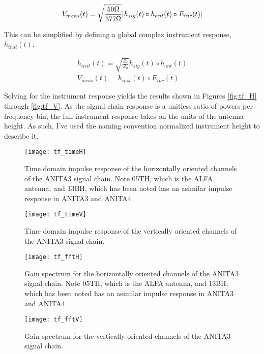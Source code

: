 \begin{equation}
V_{meas}(t) = \sqrt{\frac{50\Omega}{377\Omega}} [h_{sig}(t) \circ h_{ant}(t) \circ E_{inc}(t)] \\
\label{eqn:fullConvolution}
\end{equation}

This can be simplified by defining a global complex instrument response, $h_{inst}(t)$:

\begin{equation}
\begin{split}
h_{inst}(t) = \sqrt{\frac{Z_{c}}{Z_{o}}}h_{sig}(t) \circ h_{ant}(t) \\ 
V_{meas}(t) = h_{inst}(t) \circ E_{inc}(t)
\end{split}
\label{eqn:instTF}
\end{equation}

Solving for the instrument response yields the results shown in Figures \ref{fig:tf_H} through \ref{fig:tf_V}.  As the signal chain response is a unitless ratio of powers per frequency bin, the full instrument response takes on the units of the antenna height.  As such, I've used the naming convention normalized instrument height to describe it.

		
\begin{figure}
\centering
	\texttt{[image: tf\_timeH]}
	\caption{Time domain impulse response of the horizontally oriented channels of the ANITA3 signal chain.  Note 05TH, which is the ALFA antenna, and 13BH, which has been noted has an asimilar impulse response in ANITA3 and ANITA4}
\label{fig:tf_timeH}
\end{figure}

\begin{figure}
\centering
	\texttt{[image: tf\_timeV]}
	\caption{Time domain impulse response of the vertically oriented channels of the ANITA3 signal chain.}
\label{fig:tf_timeV}
\end{figure}

\begin{figure}
\centering
	\texttt{[image: tf\_fftH]}
	\caption{Gain spectrum for the horizontally oriented channels of the ANITA3 signal chain.  Note 05TH, which is the ALFA antenna, and 13BH, which has been noted has an asimilar impulse response in ANITA3 and ANITA4}
\label{fig:tf_fftH}
\end{figure}

\begin{figure}
\centering
	\texttt{[image: tf\_fftV]}
	\caption{Gain spectrum for the vertically oriented channels of the ANITA3 signal chain.}
\label{fig:tf_fftV}
\end{figure}


